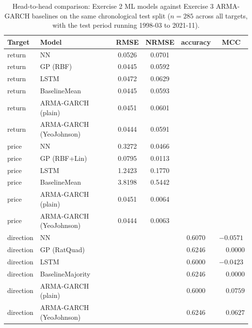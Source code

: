 \documentclass[12pt,a4paper]{article}
\begin{document}
\begin{table}[H]
\centering
\small
\begin{tabular}{llcccc}
\toprule
Target & Model & RMSE & NRMSE & accuracy & MCC \\
\midrule
return & NN                       & 0.0526 & 0.0701 &        &        \\
return & GP (RBF)                 & 0.0445 & 0.0592 &        &        \\
return & LSTM                     & 0.0472 & 0.0629 &        &        \\
return & BaselineMean             & 0.0445 & 0.0593 &        &        \\
return & ARMA-GARCH (plain)       & 0.0451 & 0.0601 &        &        \\
return & ARMA-GARCH (YeoJohnson)  & 0.0444 & 0.0591 &        &        \\
\midrule
price  & NN                       & 0.3272 & 0.0466 &        &        \\
price  & GP (RBF+Lin)             & 0.0795 & 0.0113 &        &        \\
price  & LSTM                     & 1.2423 & 0.1770 &        &        \\
price  & BaselineMean             & 3.8198 & 0.5442 &        &        \\
price  & ARMA-GARCH (plain)       & 0.0451 & 0.0064 &        &        \\
price  & ARMA-GARCH (YeoJohnson)  & 0.0444 & 0.0063 &        &        \\
\midrule
direction & NN                      &        &        & 0.6070 & $-0.0571$ \\
direction & GP (RatQuad)            &        &        & 0.6246 & $\phantom{-}0.0000$ \\
direction & LSTM                    &        &        & 0.6000 & $-0.0423$ \\
direction & BaselineMajority        &        &        & 0.6246 & $\phantom{-}0.0000$ \\
direction & ARMA-GARCH (plain)      &        &        & 0.6000 & $\phantom{-}0.0759$ \\
direction & ARMA-GARCH (YeoJohnson) &        &        & 0.6246 & $\phantom{-}0.0627$ \\
\bottomrule
\end{tabular}
\caption{Head-to-head comparison: Exercise 2 ML models against Exercise 3 ARMA-GARCH baselines on the same chronological test split ($n=285$ across all targets, with the test period running 1998-03 to 2021-11).}
\label{tab:ex3_combined}
\end{table}
\end{document}
